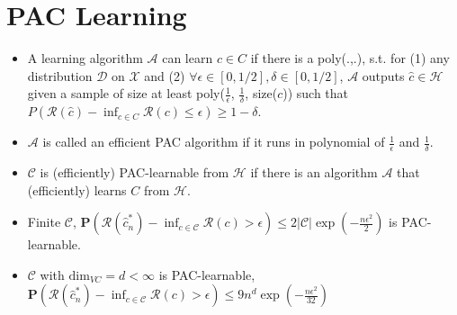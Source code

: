 \section{PAC Learning}

\begin{itemize}[itemsep=0pt,topsep=0pt, leftmargin=2pt, itemindent=5pt, labelwidth=5pt]
    \item A learning algorithm $\mathcal{A}$ can learn $c\in C$ if there is a poly(.,.), s.t. for (1) any distribution $\mathcal{D}$ on $\mathcal{X}$ and (2) $\forall \epsilon\in [0, 1/2],\delta\in [0, 1/2]$, $\mathcal{A}$ outputs $\hat{c}\in \mathcal{H}$ given a sample of size at least poly($\frac{1}{\epsilon}$, $\frac{1}{\delta}$, size($c$)) such that $P(\mathcal{R}(\hat{c})-\inf_{c\in C}\mathcal{R}(c)\le\epsilon) \ge 1-\delta$.
    \item $\mathcal{A}$ is called an efficient PAC algorithm if it runs in polynomial of $\frac{1}{\epsilon}$ and $\frac{1}{\delta}$.
    \item $\mathcal{C}$ is (efficiently) PAC-learnable from $\mathcal{H}$ if there is an algorithm $\mathcal{A}$ that (efficiently) learns $C$ from $\mathcal{H}$.
    \item Finite $\mathcal{C}$, $\mathbf{P}\left(\mathcal{R}\left(\hat{c}_{n}^{*}\right)-\inf _{c \in \mathcal{C}} \mathcal{R}(c)>\epsilon\right) \leq 2|\mathcal{C}| \exp \left(-\frac{n \epsilon^{2}}{2}\right)$  is PAC-learnable.
    \item $\mathcal{C}$ with $\mathrm{dim}_{VC} = d<\infty$ is PAC-learnable, $\mathbf{P}\left(\mathcal{R}\left(\hat{c}_{n}^{*}\right)-\inf _{c \in \mathcal{C}} \mathcal{R}(c)>\epsilon\right) \leq 9 n^{d} \exp \left(-\frac{n \epsilon^{2}}{32}\right)$
\end{itemize}

